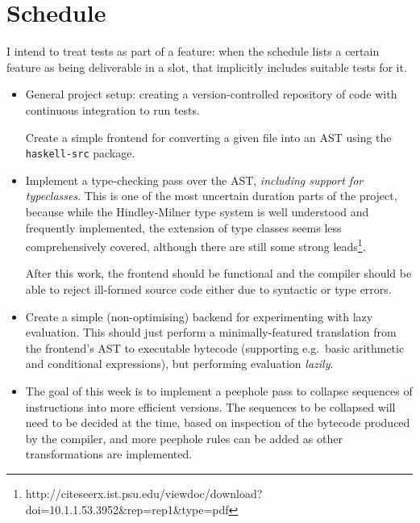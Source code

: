 \documentclass[12pt]{article}
\newcommand\monospace[1]{\texttt{#1}}
\begin{document}
\section*{Schedule}

I intend to treat tests as part of a feature: when the schedule lists a certain feature as being deliverable in a slot,
that implicitly includes suitable tests for it.




\begin{itemize}
\item
{

    General project setup: creating a version-controlled repository of code with continuous integration to run tests.

    Create a simple frontend for converting a given file into an AST using the \monospace{haskell-src} package.
}
\item
{

    Implement a type-checking pass over the AST, \textit{including support for typeclasses}. This is one of the most
    uncertain duration parts of the project, because while the Hindley-Milner type system is well understood and
    frequently implemented, the extension of type classes seems less comprehensively covered, although there are still
    some strong leads\footnote{http://citeseerx.ist.psu.edu/viewdoc/download?doi=10.1.1.53.3952\&rep=rep1\&type=pdf}.

    After this work, the frontend should be functional and the compiler should be able to reject ill-formed
    source code either due to syntactic or type errors.
}
\item
{

    Create a simple (non-optimising) backend for experimenting with lazy evaluation. This should just perform a
    minimally-featured translation from the frontend's AST to executable bytecode (supporting e.g.\ basic arithmetic and
    conditional expressions), but performing evaluation \textit{lazily}.
}
\item
{

    The goal of this week is to implement a peephole pass to collapse sequences of instructions into more efficient
    versions. The sequences to be collapsed will need to be decided at the time, based on inspection of the bytecode
    produced by the compiler, and more peephole rules can be added as other transformations are implemented.
    
}
\end{itemize}
\end{document}
